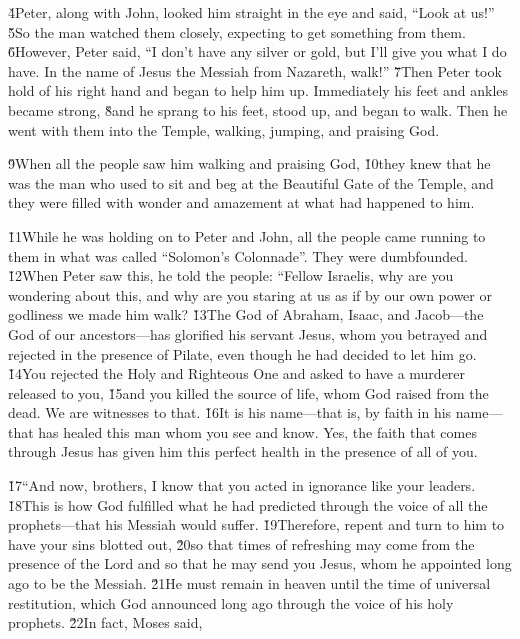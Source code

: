 \v{4}Peter, along with John, looked him straight in the eye and said, ``Look at us!'' \v{5}So the man watched them closely, expecting to get something from them. \v{6}However, Peter said, ``I don't have any silver or gold, but I'll give you what I do have. In the name of Jesus the Messiah from Nazareth, walk!'' \v{7}Then Peter took hold of his right hand and began to help him up. Immediately his feet and ankles became strong, \v{8}and he sprang to his feet, stood up, and began to walk. Then he went with them into the Temple, walking, jumping, and praising God.

\v{9}When all the people saw him walking and praising God, \v{10}they knew that he was the man who used to sit and beg at the Beautiful Gate of the Temple, and they were filled with wonder and amazement at what had happened to him.

\v{11}While he was holding on to Peter and John, all the people came running to them in what was called ``Solomon's Colonnade''. They were dumbfounded. \v{12}When Peter saw this, he told the people: ``Fellow Israelis, why are you wondering about this, and why are you staring at us as if by our own power or godliness we made him walk? \v{13}The God of Abraham, Isaac, and Jacob---the God of our ancestors---has glorified his servant Jesus, whom you betrayed and rejected in the presence of Pilate, even though he had decided to let him go. \v{14}You rejected the Holy and Righteous One and asked to have a murderer released to you, \v{15}and you killed the source of life, whom God raised from the dead. We are witnesses to that. \v{16}It is his name---that is, by faith in his name---that has healed this man whom you see and know. Yes, the faith that comes through Jesus has given him this perfect health in the presence of all of you.

\v{17}``And now, brothers, I know that you acted in ignorance like your leaders. \v{18}This is how God fulfilled what he had predicted through the voice of all the prophets---that his Messiah would suffer. \v{19}Therefore, repent and turn to him to have your sins blotted out, \v{20}so that times of refreshing may come from the presence of the Lord and so that he may send you Jesus, whom he appointed long ago to be the Messiah. \v{21}He must remain in heaven until the time of universal restitution, which God announced long ago through the voice of his holy prophets. \v{22}In fact, Moses said,

